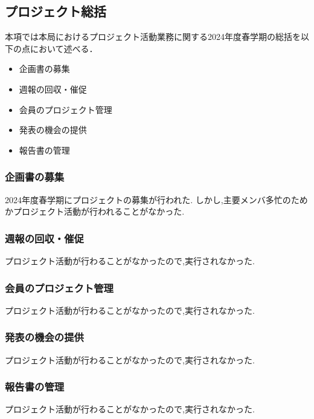 
\subsection*{プロジェクト総括}


本項では本局におけるプロジェクト活動業務に関する2024年度春学期の総括を以下の点において述べる．

\begin{itemize}
  \item 企画書の募集
  \item 週報の回収・催促
  \item 会員のプロジェクト管理
  \item 発表の機会の提供
  \item 報告書の管理
\end{itemize}

\subsubsection*{企画書の募集}

2024年度春学期にプロジェクトの募集が行われた.
しかし,主要メンバ多忙のためかプロジェクト活動が行われることがなかった.

\subsubsection*{週報の回収・催促}

プロジェクト活動が行わることがなかったので,実行されなかった.

\subsubsection*{会員のプロジェクト管理}

プロジェクト活動が行わることがなかったので,実行されなかった.

\subsubsection*{発表の機会の提供}

プロジェクト活動が行わることがなかったので,実行されなかった.

\subsubsection*{報告書の管理}

プロジェクト活動が行わることがなかったので,実行されなかった.
